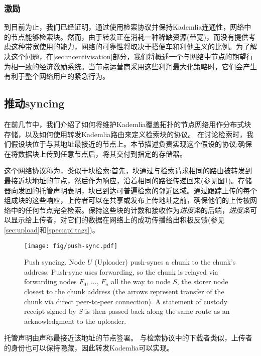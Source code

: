 \subsubsection{激励}

到目前为止，我们已经证明，通过使用检索协议并保持Kademlia连通性，网络中的节点能够检索块。然而，由于转发正在消耗一种稀缺资源(带宽)，而没有提供考虑这种带宽使用的能力，网络的可靠性将取决于搭便车和利他主义的比例。为了解决这个问题，在\ref{sec:incentivisation}部分，我们将概述一个与网络中节点的期望行为相一致的经济激励系统。当节点运营商采用这些利润最大化策略时，它们会产生有利于整个网络用户的紧急行为。
 
\subsection{推动syncing\statusgreen}\label{sec:push-syncing}
 
在前几节中，我们介绍了如何将维护Kademlia覆盖拓扑的节点网络用作分布式块存储，以及如何使用转发Kademlia路由来定义检索块的协议。
在讨论检索时，我们假设块位于与其地址最接近的节点上。本节描述负责实现这个假设的协议:确保在将数据块上传到任意节点后，将其交付到指定的存储器。

这个网络协议称为，类似于块检索:首先，块通过与检索请求相同的路由被转发到最接近块地址的节点，然后作为响应，沿着相同的路径传递回来(参见图\ref{fig:push-syncing})。存储器向发回的托管声明表明，块已到达可普遍检索的邻近区域。通过跟踪上传的每个组成块的这些响应，上传者可以在共享或发布上传地址之前，确保他们的上传被网络中的任何节点完全检索。保持这些块的计数和接收作为\emph{进度条}的后端，\emph{进度条}可以显示给上传者，对它们的数据在网络上的成功传播给出积极反馈(参见\ref{sec:upload}和\ref{spec:api:tags})。


\begin{figure}[htbp]
   \centering
   \texttt{[image: fig/push-sync.pdf]}
   \caption[Push syncing \statusgreen]{Push syncing. Node $U$ (Uploader) push-syncs a chunk to the chunk's address. Push-sync uses forwarding, so the chunk is relayed via forwarding nodes $F_0$, ..., $F_n$ all the way to node $S$, the storer node closest to the chunk address (the arrows represent transfer of the chunk  via direct peer-to-peer connection). A statement of custody receipt signed by $S$ is then passed back along the same route as an acknowledgment to the uploader.}
   \label{fig:push-syncing}
\end{figure}

托管声明由声称最接近该地址的节点签署。 
与检索协议中的下载者类似，上传者的身份也可以保持隐藏，因此转发Kademlia可以实现。

